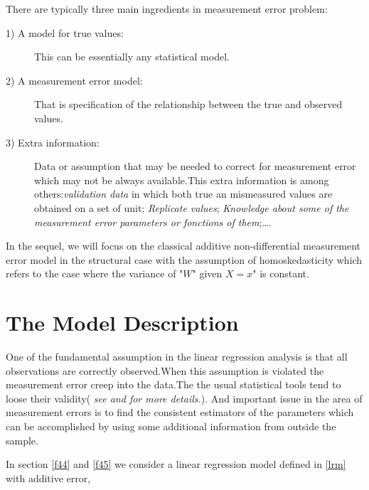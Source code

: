 \documentclass[12pt]{report}
\begin{document}
There are typically three main ingredients in  measurement error problem:
\begin{description}
\item[1) A model for true values:] This can be essentially any statistical model.
\item[2) A measurement error model:] That is specification of the relationship between the true and observed values.
\item[3) Extra information:] Data or assumption that may be needed to correct for measurement error which may not be always available.This extra information is among others:\textit{validation data} in which both true an mismeasured values are obtained on a set of unit; \textit{Replicate values}; \textit{Knowledge about some of the measurement error parameters or fonctions of them};\dots .
\end{description}

In the sequel, we will focus on the classical additive non-differential measurement error model in the structural case with the assumption of homoskedasticity which refers to  the case where the variance of "$W$" given $X=x$" is constant.
\section{The Model Description}  
One of the fundamental assumption in the linear regression analysis is that all observations are correctly observed.When this assumption is violated the measurement error creep into the data.The the usual statistical tools tend to loose their validity( \textit{see \cite{nref2} and \cite{nref3} for more details.}). And important issue in the area of measurement errors is to find the consistent estimators of the parameters which can be accomplished by using some additional information from outside the sample.

In section \ref{f44} and \ref{f45} we consider a linear regression model defined in \eqref{lrm} with additive error,
\end{document}
